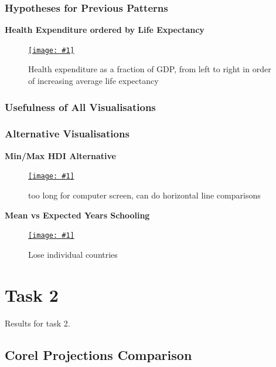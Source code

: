 \documentclass[11pt,a4paper,final]{article}
\newcommand\onlinefig[3]{
\begin{figure}[H]
  \centering
  \href{#3}{\texttt{[image: \#1]}}
  \caption{#2} 
  \label{fig:#1}
\end{figure}
}
\begin{document}
\begin{multicols}{2}
\subsubsection{Hypotheses for Previous Patterns}
\begin{flushleft}
\textbf{Health Expenditure ordered by Life Expectancy}
\end{flushleft}
\onlinefig{health_expenditure_ordered_by_life_expectancy}{Health expenditure as a fraction of GDP, from left to right in order of increasing average life expectancy}{https://public.tableau.com/views/CS3205-HDI/Sheet9?:language=en-GB&:display_count=n&:origin=viz_share_link}

\subsubsection{Usefulness of All Visualisations}


\subsubsection{Alternative Visualisations}
\begin{flushleft}
\textbf{Min/Max HDI Alternative}
\end{flushleft}
\onlinefig{min_vs_max_hdi_sidebysidecircleplot}{too long for computer screen, can do horizontal line comparisons}{https://public.tableau.com/views/CS3205_hdi_csv/Sheet1?:language=en-GB&:display_count=n&:origin=viz_share_link}

\begin{flushleft}
\textbf{Mean vs Expected Years Schooling}
\end{flushleft}
\onlinefig{mean_vs_expected_years_schooling_bar_and_linegraph}{Lose individual countries}{https://public.tableau.com/views/CS3205-HDI/Sheet4?:language=en-GB&:display_count=n&:origin=viz_share_link}

\end{multicols}
\pagebreak


\section{Task 2}
Results for task 2.
\subsection{Corel Projections Comparison}
\end{document}
